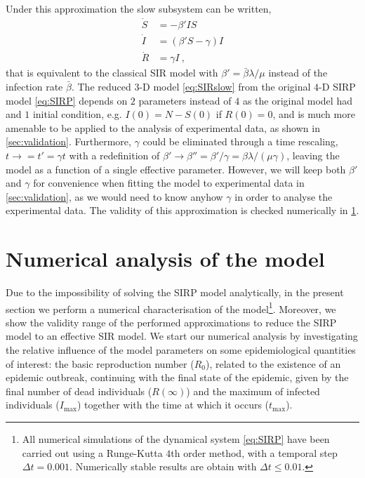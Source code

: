 Under this approximation the slow subsystem can be written,
\begin{equation}\label{eq:SIRslow}
    \begin{aligned}
        \dot{S} & =-\beta' I S         \\
        \dot{I} & =(\beta' S-\gamma) I \\
        \dot{R} & =\gamma I\ ,
    \end{aligned}
\end{equation}
that is equivalent to the classical SIR model with $\beta'=\bar{\beta}
    \lambda/\mu$ instead of the infection rate $\bar{\beta}$. The reduced $3$-D
model \cref{eq:SIRslow} from the original $4$-D SIRP model \cref{eq:SIRP}
depends on $2$ parameters instead of $4$ as the original model had and $1$
initial condition, e.g. $I(0)=N-S(0)$ if $R(0)=0$, and is much more amenable to
be applied to the analysis of experimental data, as shown in
\cref{sec:validation}.
Furthermore, $\gamma$ could be eliminated through a time rescaling,
$t\rightarrow=t'=\gamma t$ with a redefinition of
$\beta'\rightarrow\beta''=\beta'/\gamma=\beta\lambda/(\mu\gamma)$, leaving the
model as a function of a single effective parameter. However, we will keep both
$\beta'$ and $\gamma$ for convenience when fitting the model to experimental
data in \cref{sec:validation}, as we would need to know anyhow $\gamma$ in
order to analyse the experimental data. The validity of this approximation is
checked numerically in \cref{sec:numericalanalysis}.

\section{Numerical analysis of the model} \label{sec:numericalanalysis}

Due to the impossibility of solving the SIRP model analytically,
in the present section we perform a numerical characterisation of the
model\footnote{All numerical simulations of the dynamical system
    \cref{eq:SIRP} have been carried out using a Runge-Kutta $4$th order
    method,
    with a temporal step $\Delta t=0.001$. Numerically stable results are
    obtain
    with $\Delta t\le 0.01$.}.
Moreover, we show the validity range of the performed approximations to
reduce the SIRP model to an effective SIR model. We start our numerical
analysis by investigating the relative influence of the model parameters on
some epidemiological quantities of interest: the basic reproduction number
($R_0$), related to the existence of an epidemic outbreak, continuing with the
final state of the epidemic, given by the final number of dead individuals
($R(\infty)$) and the maximum of infected individuals ($I_{\textrm{max}}$)
together with the time at which it occurs ($t_{\textrm{max}}$).


